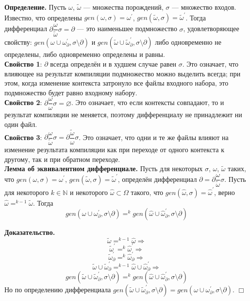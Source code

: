 \textbf{Определение.} Пусть $\omega$, $\tilde{\omega}$ --- множества порождений, $\sigma$ --- множество входов. Известно, что определены $gen(\omega, \sigma) = \omega^\prime$, $gen(\tilde{\omega}, \sigma) = \tilde{\omega}^\prime$. Тогда дифференциал $\partial\dfrac{\omega}{\tilde{\omega}}\sigma = \partial$ --- это наименьшее подмножество $\sigma$, удовлетворяющее свойству: 
$gen(\omega \cup \omega^\prime_{\partial}, \sigma\setminus\partial)$ и
$gen(\tilde{\omega} \cup \tilde{\omega}^\prime_{\partial}, \sigma\setminus\partial)$ либо одновременно не определены, либо одновременно определены и равны.\\

\textbf{Свойство 1}: $\partial$ всегда определён и в худшем случае равен $\sigma$. Это означает, что влияющее на результат компиляции подмножество можно выделить всегда; при этом, когда изменение контекста затронуло все файлы входного набора, это подмножество будет равно входному набору.\\

\textbf{Свойство 2}: $\partial\dfrac{\omega}{\omega}\sigma = \varnothing$. Это означает, что если контексты совпадают, то и результат компиляции не меняется, поэтому дифференциалу не принадлежит ни один файл.\\

\textbf{Свойство 3}: $\partial\dfrac{\omega}{\tilde{\omega}}\sigma = \partial\dfrac{\tilde{\omega}}{\omega}\sigma$. Это означает, что одни и те же файлы влияют на изменение результата компиляции как при переходе от одного контекста к другому, так и при обратном переходе.\\

\textbf{Лемма об эквивалентном дифференциале.} Пусть для некоторых $\sigma$, $\omega$, $\tilde{\omega}$ таких, что $gen(\omega, \sigma) = \omega^\prime$, $gen(\tilde{\omega}, \sigma) = \tilde{\omega}^\prime$, определён дифференциал $\partial = \partial\dfrac{\omega}{\tilde{\omega}}\sigma$. Пусть для некоторого $k \in \mathbb{N}$ и некоторого $\hat{\omega} \subset \Omega$ такого, что $gen(\hat{\omega}, \sigma) = \hat{\omega}^\prime$, верно $\hat{\omega} =^{k-1} \tilde{\omega}$. Тогда $$gen(\omega \cup \omega^\prime_\partial, \sigma\setminus\partial) =^k gen(\hat{\omega} \cup \hat{\omega}^\prime_\partial, \sigma\setminus\partial)$$

\textbf{Доказательство.}
$$\tilde{\omega} =^{k-1} \hat{\omega} \Rightarrow$$
$$\tilde{\omega}^\prime =^{k} \hat{\omega}^\prime \Rightarrow$$
$$\tilde{\omega}^\prime_\partial =^{k} \hat{\omega}^\prime_\partial \Rightarrow$$
$$\tilde{\omega} \cup \tilde{\omega}^\prime_\partial =^{k-1} \hat{\omega} \cup \hat{\omega}^\prime_\partial \Rightarrow$$
$$gen(\tilde{\omega} \cup \tilde{\omega}^\prime_\partial, \sigma\setminus\partial) =^{k} gen(\hat{\omega} \cup \hat{\omega}^\prime_\partial, \sigma\setminus\partial)$$
Но по определению дифференциала $gen(\tilde{\omega} \cup \tilde{\omega}^\prime_\partial, \sigma\setminus\partial) = gen(\omega \cup \omega^\prime_{\partial}, \sigma\setminus\partial)$. $\Box$\\

